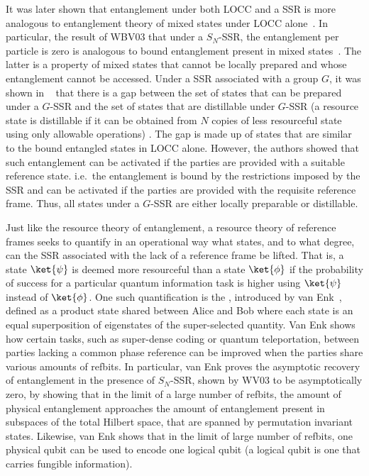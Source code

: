 It was later shown that entanglement under both LOCC and a SSR is more analogous to entanglement theory of mixed states under LOCC alone~\cite{BDSW06,JWBVP06}.  In particular, the result of WBV03 that under a $S_N$-SSR, the entanglement per particle is zero is analogous to bound entanglement present in mixed states~\cite{HHH98}.  The latter is a property of mixed states that cannot be locally prepared and whose entanglement cannot be accessed.  Under a SSR associated with a group $G$, it was shown in ~\cite{BDSW06,JWBVP06} that there is a gap between the set of states that can be prepared under a $G$-SSR and the set of states that are distillable under $G$-SSR (a resource state is distillable if it can be obtained from $N$ copies of less resourceful state using only allowable operations) .  The gap is made up of states that are similar to the bound entangled states in LOCC alone.  However, the authors showed that such entanglement can be activated if the parties are provided with a suitable reference state. i.e.~the entanglement is bound by the restrictions imposed by the SSR and can be activated if the parties are provided with the requisite reference frame. Thus, all states under a $G$-SSR are either locally preparable or distillable.   

Just like the resource theory of entanglement, a resource theory of reference frames seeks to quantify in an operational way what states, and to what degree, can the SSR associated with the lack of a reference frame be lifted. That is, a state $\ket{\psi}$ is deemed more resourceful than a state $\ket{\phi}$ if the probability of success for a particular quantum information task is higher using $\ket{\psi}$ instead of $\ket{\phi}$.   One such quantification is the , introduced by van Enk~\cite{vE05b}, defined as a product state shared between Alice and Bob where each state is an equal superposition of eigenstates of the super-selected quantity.   Van Enk shows how certain tasks, such as super-dense coding or quantum teleportation, between parties lacking a common phase reference can be improved when the parties share various amounts of refbits.   In particular, van Enk proves the asymptotic recovery of entanglement in the presence of $S_N$-SSR, shown by WV03 to be asymptotically zero, by showing that in the limit of a large number of refbits, the amount of physical entanglement approaches the amount of entanglement present in subspaces of the total Hilbert space, that are spanned by permutation invariant states.  Likewise, van Enk shows that in the limit of large number of refbits, one physical qubit can be used to encode one logical qubit (a logical qubit is one that carries fungible information).  

